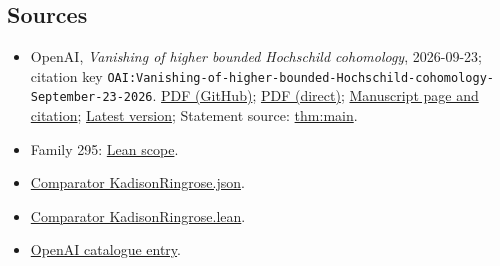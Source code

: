 \documentclass[11pt]{article}
\begin{document}
\subsection{Sources}
\begin{itemize}
\item OpenAI, \emph{Vanishing of higher bounded Hochschild cohomology}, 2026-09-23; citation key \texttt{OAI:Vanishing-of-higher-bounded-Hochschild-cohomology-September-23-2026}. \href{https://github.com/openai/math/blob/adc7f1241b42e322a6451854ab7e4b4c146bf78a/preprints/Vanishing-of-higher-bounded-Hochschild-cohomology-September-23-2026/paper.pdf}{PDF (GitHub)}; \href{https://github.com/openai/math/raw/adc7f1241b42e322a6451854ab7e4b4c146bf78a/preprints/Vanishing-of-higher-bounded-Hochschild-cohomology-September-23-2026/paper.pdf}{PDF (direct)}; \href{https://github.com/openai/math/blob/adc7f1241b42e322a6451854ab7e4b4c146bf78a/preprints/Vanishing-of-higher-bounded-Hochschild-cohomology-September-23-2026/README.md}{Manuscript page and citation}; \href{https://github.com/openai/math/blob/main/preprints/Vanishing-of-higher-bounded-Hochschild-cohomology-September-23-2026/paper.pdf}{Latest version}; Statement source: \href{https://github.com/openai/math/blob/adc7f1241b42e322a6451854ab7e4b4c146bf78a/preprints/Vanishing-of-higher-bounded-Hochschild-cohomology-September-23-2026/build/sections/01-introduction.tex\#L47}{thm:main}.
\item Family 295: \href{https://github.com/openai/math/blob/adc7f1241b42e322a6451854ab7e4b4c146bf78a/lean/docs/295.md}{Lean scope}.
\item \href{https://github.com/openai/math/blob/adc7f1241b42e322a6451854ab7e4b4c146bf78a/lean/ComparatorChallenges/KadisonRingrose.json}{Comparator KadisonRingrose.json}.
\item \href{https://github.com/openai/math/blob/adc7f1241b42e322a6451854ab7e4b4c146bf78a/lean/ComparatorChallenges/KadisonRingrose.lean}{Comparator KadisonRingrose.lean}.
\item \href{https://github.com/openai/math/blob/adc7f1241b42e322a6451854ab7e4b4c146bf78a/CONTENTS.md}{OpenAI catalogue entry}.
\end{itemize}
\end{document}
